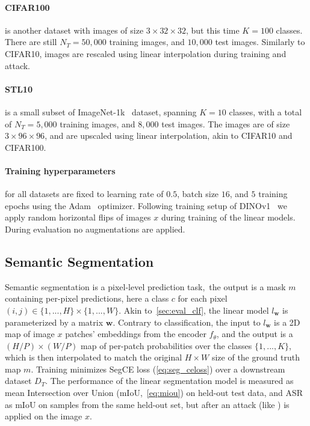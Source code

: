 \paragraph{CIFAR100~\cite{cifar}} is another dataset with images of size $3\times 32\times 32$, but this time $K=100$ classes. There are still $N_T=50,000$ training images, and $10,000$ test images. Similarly to CIFAR10, images are rescaled using linear interpolation during training and attack.

\paragraph{STL10~\cite{stl10}} is a small subset of ImageNet-1k~\cite{imagenet} dataset, spanning $K=10$ classes, with a total of $N_T=5,000$ training images, and $8,000$ test images. The images are of size $3\times 96\times 96$, and are upscaled using linear interpolation, akin to CIFAR10 and CIFAR100.

\paragraph{Training hyperparameters} for all datasets are fixed to learning rate of $0.5$, batch size $16$, and $5$ training epochs using the Adam~\cite{adam} optimizer. Following training setup of DINOv1~\cite{dinov1} we apply random horizontal flips of images $x$ during training of the linear models. During evaluation no augmentations are applied.

\subsection{Semantic Segmentation}

Semantic segmentation is a pixel-level prediction task,~\ie the output is a mask $m$ containing per-pixel predictions, here a class $c$ for each pixel $(i,j)\in\{1,...,H\}\times\{1,...,W\}$. Akin to~\cref{sec:eval_clf}, the linear model $l_\mathbf{w}$ is parameterized by a matrix $\mathbf{w}$. Contrary to classification, the input to $l_\mathbf{w}$ is a 2D map of image $x$ patches' embeddings from the encoder $f_\theta$, and the output is a $(H/P)\times(W/P)$ map of per-patch probabilities over the classes $\{1,...,K\}$, which is then interpolated to match the original $H\times W$ size of the ground truth map $m$. Training minimizes SegCE loss (\cref{eq:seg_celoss}) over a downstream dataset $D_T$. The performance of the linear segmentation model is measured as mean Intersection over Union (mIoU,~\cref{eq:miou}) on held-out test data, and ASR as mIoU on samples from the same held-out set, but after an attack (like \SegPGD) is applied on the image $x$.

